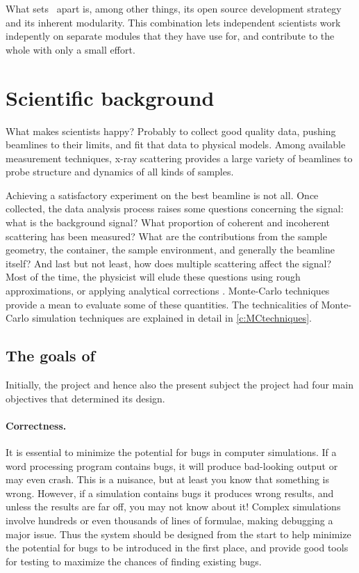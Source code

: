 What sets \MCX\ apart is, among other things, its open source
development strategy and its inherent modularity. 
This combination lets independent scientists work indepently on separate
modules that they have use for, and contribute to the whole with only a small
effort.

\section{Scientific background}
What makes scientists happy? Probably to collect good quality data, pushing beamlines to their limits, and fit that data to physical models.
Among available measurement techniques, x-ray scattering provides a
large variety of beamlines to probe structure and dynamics of all
kinds of samples.

Achieving a satisfactory experiment on the best beamline is not all. Once collected, the data analysis process
raises some questions concerning the signal: what is the background
signal? What proportion of coherent and incoherent scattering has
been measured? What are the contributions from the sample geometry, the
container, the sample environment, and generally the beamline
itself? And last but not least, how does multiple scattering affect the
signal? Most of the time, the physicist will elude these questions
using rough approximations, or applying analytical corrections
\cite{Copley86}. Monte-Carlo techniques provide a mean to evaluate
some of these quantities. The technicalities of Monte-Carlo simulation
techniques are explained in detail in \cref{c:MCtechniques}.


\subsection{The goals of \MCX}
\label{s:goals}

Initially, the \MCS project and hence also the present subject the \MCX project had four main objectives
that determined its design.

\paragraph{Correctness.}
It is essential to minimize the potential for bugs in computer
simulations.  If a word processing program contains bugs, it will
produce bad-looking output or may even crash. This is a nuisance, but at
least you know that something is wrong. However, if a simulation
contains bugs it produces wrong results, and unless the results are far
off, you may not know about it! Complex simulations involve hundreds or
even thousands of lines of formulae, making debugging a major issue. Thus the
system should be designed from the start to help minimize the potential
for bugs to be introduced in the first place, and provide good tools for
testing to maximize the chances of finding existing bugs.
%
